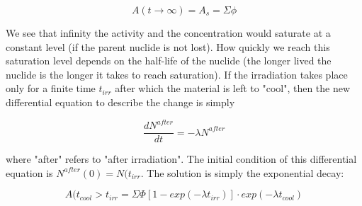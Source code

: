 \begin{equation}
A(t\rightarrow \infty)=A_s=\Sigma\phi
\end{equation}

\noindent We see that infinity the activity and the concentration would saturate at a constant level (if the parent nuclide is not lost). How quickly we reach this saturation level depends on the half-life of the nuclide (the longer lived the nuclide is the longer it takes to reach saturation). If the irradiation takes place only for a finite time $t_{irr}$ after which the material is left to "cool", then the new differential equation to describe the change is simply

\begin{equation}
\frac{dN^{after}}{dt}=-\lambda N^{after}
\end{equation}

\noindent where "after" refers to "after irradiation". The initial condition of this differential equation is $N^{after}(0)=N(t_{irr}$. The solution is simply the exponential decay:

\begin{equation}
A(t_{cool}>t_{irr}=\Sigma\Phi[1-exp(-\lambda t_{irr})]\cdot exp(-\lambda t_{cool})
\end{equation}


